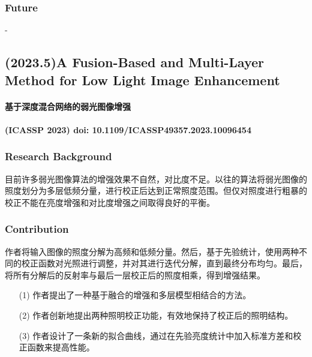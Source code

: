 \documentclass[a4paper, 10pt]{article}
\begin{document}
			\subsubsection{Future}
			
			-
			
		\subsection{(2023.5)A Fusion-Based and Multi-Layer Method for Low Light Image Enhancement}
	
		\paragraph{基于深度混合网络的弱光图像增强}
	
		\paragraph{(ICASSP 2023) doi: 10.1109/ICASSP49357.2023.10096454}
		
			\subsubsection{Research Background}
			
			目前许多弱光图像算法的增强效果不自然，对比度不足。以往的算法将弱光图像的照度划分为多层低频分量，进行校正后达到正常照度范围。但仅对照度进行粗暴的校正不能在亮度增强和对比度增强之间取得良好的平衡。
			
			\subsubsection{Contribution}
			
			作者将输入图像的照度分解为高频和低频分量。然后，基于先验统计，使用两种不同的校正函数对光照进行调整，并对其进行迭代分解，直到最终分布均匀。最后，将所有分解后的反射率与最后一层校正后的照度相乘，得到增强结果。
			
			\begin{itemize}
				\item[(1)] 
				作者提出了一种基于融合的增强和多层模型相结合的方法。
				
				\item[(2)]
				作者创新地提出两种照明校正功能，有效地保持了校正后的照明结构。
				
				\item[(3)]
				作者设计了一条新的拟合曲线，通过在先验亮度统计中加入标准方差和校正函数来提高性能。
			\end{itemize}	
			
\end{document}
